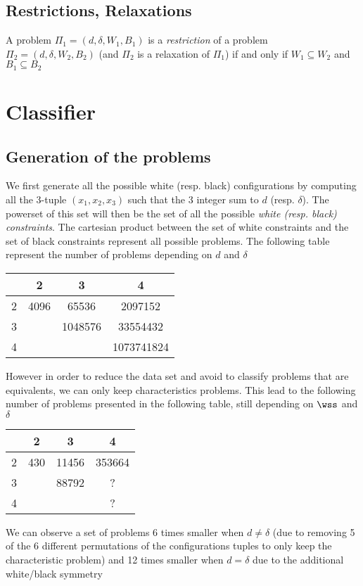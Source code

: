 \documentclass{article}
\theoremstyle{definition}
\newcommand{\wdd}[0]{d}
\newcommand{\bdd}[0]{\delta}
\begin{document}
\subsection{Restrictions, Relaxations}
A problem $\Pi_1 = (\wdd,\bdd,W_1,B_1)$ is a \textit{restriction} of a problem $\Pi_2 = (\wdd,\bdd,W_2,B_2)$ (and $\Pi_2$ is a relaxation of $\Pi_1$) if and only if $W_1\subseteq W_2$ and $B_1\subseteq B_2$
\section{Classifier}
\subsection{Generation of the problems}
We first generate all the possible white (resp. black) configurations by computing all the 3-tuple $(x_1,x_2, x_3)$ such that the 3 integer sum to $\wdd$ (resp. $\bdd$).
The powerset of this set will then be the set of all the possible \textit{white (resp. black) constraints}.
The cartesian product between the set of white constraints and the set of black constraints represent all possible problems. The following table represent the number of problems depending on $\wdd$ and $\bdd$
\begin{center}
\begin{tabular}{ | c | c | c | c |}
 \hline
 \diagbox{$\wdd$}{$\bdd$} & 2 & 3 & 4 \\ 
 \hline
 2 & 4096 & 65536 & 2097152\\
 \hline
 3 &  & 1048576 & 33554432\\
 \hline
 4 &  &  &  1073741824\\
\hline
\end{tabular}
\end{center}
However in order to reduce the data set and avoid to classify problems that are equivalents, we can only keep characteristics problems. This lead to the following number of problems presented in the following table, still depending on $\wss$ and $\bdd$
\begin{center}
\begin{tabular}{ | c | c | c | c |}
 \hline
 \diagbox{$\wdd$}{$\bdd$} & 2 & 3 & 4 \\ 
 \hline
 2 & 430 & 11456 & 353664\\
 \hline
 3 &  & 88792 & ?\\
 \hline
 4 &  &  &  ?\\
\hline
\end{tabular}
\end{center}
We can observe a set of problems 6 times smaller when $\wdd \neq \bdd$ (due to removing 5 of the 6 different permutations of the configurations tuples to only keep the characteristic problem) and 12 times smaller when $\wdd=\bdd$ due to the additional white/black symmetry
\end{document}
